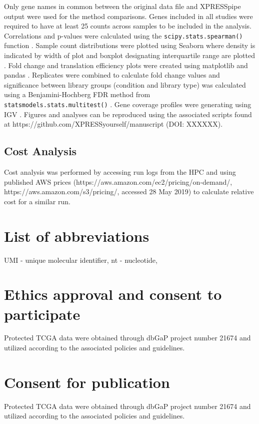 \documentclass[11pt, a4paper, oneside]{article}
\begin{document}
Only gene names in common between the original data file and XPRESSpipe output were used for the method comparisons. Genes included in all studies were required to have at least 25 counts across samples to be included in the analysis. Correlations and p-values were calculated using the \texttt{scipy.stats.spearman()} function \cite{spearman_rnaseq}. Sample count distributions were plotted using Seaborn where density is indicated by width of plot and boxplot designating interquartile range are plotted \cite{seaborn}. Fold change and translation efficiency plots were created using matplotlib \cite{matplotlib} and pandas \cite{pandas}. Replicates were combined to calculate fold change values and significance between library groups (condition and library type) was calculated using a Benjamini-Hochberg FDR method from \texttt{statsmodels.stats.multitest()} \cite{statsmodels}. Gene coverage profiles were generating using IGV \cite{igv}. Figures and analyses can be reproduced using the associated scripts found at https://github.com/XPRESSyourself/manuscript (DOI: XXXXXX).

\subsection{Cost Analysis}
Cost analysis was performed by accessing run logs from the HPC and using published AWS prices (https://aws.amazon.com/ec2/pricing/on-demand/, https://aws.amazon.com/s3/pricing/, accessed 28 May 2019) to calculate relative cost for a similar run.

\section*{List of abbreviations}
UMI - unique molecular identifier, nt - nucleotide,

\section*{Ethics approval and consent to participate}
Protected TCGA data were obtained through dbGaP project number 21674 and utilized according to the associated policies and guidelines.

\section*{Consent for publication}
Protected TCGA data were obtained through dbGaP project number 21674 and utilized according to the associated policies and guidelines.
\end{document}
